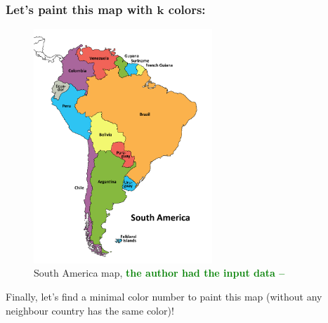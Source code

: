 \documentclass{beamer}
\begin{document}
\begin{frame}[fragile] 

\frametitle{Let's paint this map with \(\textbf{k}\) colors:}
	
\begin{figure}[tbp]
  \centering
    \includegraphics[width=0.6\textwidth , height=0.65\textheight] {south_america.png}
   \caption{South America map, \textcolor{green}{\textbf{the author had the input data --  \Smiley{}}} }
	
\end{figure}
	
\pause

Finally, let's find a minimal color number to paint this map (without any neighbour country has the same color)!

\end{frame}


\end{document}
